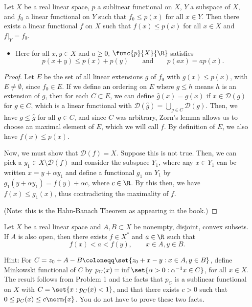 \documentclass[12pt,letterpaper,twoside]{hmcpset}
\begin{document}
\begin{problem}[1]
  Let $X$ be a real linear space, $p$ a sublinear functional on $X$, $Y$ a subspace of $X$, and $f_{0}$ a linear functional on $Y$ such that $f_{0} \leq p(x)$ for all $x \in Y$.
Then there exists a linear functional $f$ on $X$ such that $f(x) \leq p(x)$ for all $x \in X$ and $f|_{Y} = f_{0}$.
\begin{itemize}
\item Here for all $x,y \in X$ and $a \geq 0$, $\func{p}{X}{\R}$ satisfies \[p(x+y) \leq p(x) + p(y) \qquad \text{and} \qquad p(ax) = ap(x).\]
\end{itemize}
\end{problem}

\begin{solution}
  \begin{proof}
    Let $E$ be the set of all linear extensions $g$ of $f_{0}$ with
    $g(x) \leq p(x)$, with $E \neq \emptyset$, since $f_{0} \in E$.
    If we define an ordering on $E$ where $g \leq h$ means $h$ is an
    extension of $g$, then for each $C \subset E$, we can define $\hat{g}(x) = g(x)$ if $x\in \mathscr{D}(g)$ for $g \in C$, which is a linear functional with $\mathscr{D}(\hat{g}) = \bigcup_{g\in C}\mathscr{D}(g)$.  
Then, we have $g \leq \hat{g}$ for all $g \in C$, and since $C$ was arbitrary, Zorn's lemma allows us to choose an maximal element of $E$, which we will call $f$.  
By definition of $E$, we also have $f(x) \leq p(x)$.

Now, we must show that $\mathscr{D}(f) = X$. Suppose this is not true.  
Then, we can pick a $y_{1} \in X\setminus\mathscr{D}(f)$ and consider the subspace $Y_{1}$, where any $x \in Y_{1}$ can be written $x=y + \alpha y_{1}$ and define a functional $g_{1}$ on $Y_{1}$ by $g_{1}(y + \alpha y_{1}) = f(y) + \alpha c$, where $c \in \R$. 
By this then, we have $f(x) \leq g_{1}(x)$, thus contradicting the maximality of $f$. 

(Note: this is the Hahn-Banach Theorem as appearing in the book.)
  \end{proof}
\end{solution}

\begin{problem}[2]
  Let $X$ be a real linear space and $A,B \subset X$ be nonempty, disjoint, convex subsets.
  If $A$ is also open, then there exists $f \in X^{*}$ and $a \in \R$ such that \[f(x) < a < f(y), \qquad x \in A, y \in B.\]
  
  Hint: For $C = z_{0} + A - B \coloneqq \set{z_{0} + x - y : x \in A, y \in B}$, define Minkowski functional of $C$ by $p_{C}(x) = \inf \set{\alpha > 0 : \alpha^{-1}x \in C}$, for all $x \in X$.
    The result follows from Problem 1 and the facts that $p_{C}$ is a sublinear functional on $X$ with $C = \set{x : p_{C}(x) < 1}$, and that there exists $c > 0$ such that $0 \leq p_{C}(x) \leq c\norm{x}$. 
    You do not have to prove these two facts. 
\end{problem}
\end{document}

